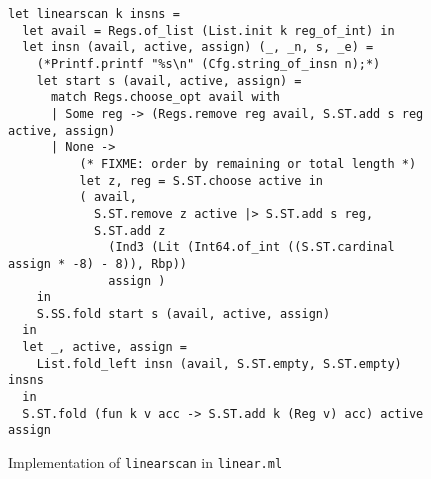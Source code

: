 \documentclass{article}
\begin{document}
\begin{figure}[H]
     \centering
     \begin{verbatim}
let linearscan k insns =
  let avail = Regs.of_list (List.init k reg_of_int) in
  let insn (avail, active, assign) (_, _n, s, _e) =
    (*Printf.printf "%s\n" (Cfg.string_of_insn n);*)
    let start s (avail, active, assign) =
      match Regs.choose_opt avail with
      | Some reg -> (Regs.remove reg avail, S.ST.add s reg active, assign)
      | None ->
          (* FIXME: order by remaining or total length *)
          let z, reg = S.ST.choose active in
          ( avail,
            S.ST.remove z active |> S.ST.add s reg,
            S.ST.add z
              (Ind3 (Lit (Int64.of_int ((S.ST.cardinal assign * -8) - 8)), Rbp))
              assign )
    in
    S.SS.fold start s (avail, active, assign)
  in
  let _, active, assign =
    List.fold_left insn (avail, S.ST.empty, S.ST.empty) insns
  in
  S.ST.fold (fun k v acc -> S.ST.add k (Reg v) acc) active assign
     \end{verbatim}
     \caption{Implementation of \texttt{linearscan} in \texttt{linear.ml}}\label{fig:linearscan-ocaml}
\end{figure}


%





%
%
%
%
%
%
\end{document}
